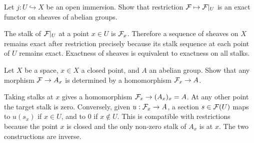 \begin{exercise}\label{ex:restriction-exact}
Let \(j:U\hookrightarrow X\) be an open immersion.  Show that restriction
\(\mathcal{F}\mapsto\mathcal{F}|_U\) is an exact functor on sheaves of abelian groups.
\end{exercise}

\begin{solution}
The stalk of \(\mathcal{F}|_U\) at a point \(x\in U\) is \(\mathcal{F}_x\).  Therefore a
sequence of sheaves on \(X\) remains exact after restriction precisely because
its stalk sequence at each point of \(U\) remains exact.  Exactness of sheaves
is equivalent to exactness on all stalks.
\end{solution}

\begin{exercise}\label{ex:skyscraper-quotient}
Let \(X\) be a space, \(x\in X\) a closed point, and \(A\) an abelian group.
Show that any morphism \(\mathcal{F}\to A_x\) is determined by a homomorphism
\(\mathcal{F}_x\to A\).
\end{exercise}

\begin{solution}
Taking stalks at \(x\) gives a homomorphism \(\mathcal{F}_x\to(A_x)_x=A\).  At any
other point the target stalk is zero.  Conversely, given \(u:\mathcal{F}_x\to A\), a
section \(s\in\mathcal{F}(U)\) maps to \(u(s_x)\) if \(x\in U\), and to \(0\) if
\(x\notin U\).  This is compatible with restrictions because the point \(x\)
is closed and the only non-zero stalk of \(A_x\) is at \(x\).  The two
constructions are inverse.
\end{solution}
